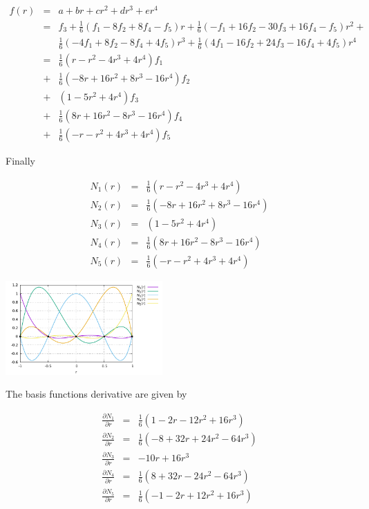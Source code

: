 \begin{eqnarray}
f(r) 
&=& a+br+cr^2+dr^3+er^4 \\
&=& f_3 + 
\frac{1}{6} \left( f_1 -8f_2 +8 f_4 -f_5     \right)  r  +
\frac{1}{6} \left( -f_1 +16f_2 -30f_3    + 16f_4- f_5   \right) r^2 +\\ &&
\frac{1}{6} \left( -4f_1 +8f_2     -8f_4+ 4 f_5   \right) r^3 +
\frac{1}{6} \left( 4f_1 -16f_2 +24f_3 -16f_4+ 4 f_5   \right) r^4 \\
&=& \frac{1}{6} \left(  r- r^2 -4r^3 +4r^4\right) f_1 \\
&+& \frac{1}{6} \left(  -8r+16 r^2 +8r^3 -16 r^4\right) f_2 \\
&+& \left( 1 -5r^2+4r^4  \right) f_3 \\
&+& \frac{1}{6} \left(  8r+16 r^2 -8r^3 -16 r^4\right) f_4 \\
&+& \frac{1}{6} \left(  -r- r^2 +4r^3 +4r^4\right) f_5
\end{eqnarray}

Finally
\begin{mdframed}[backgroundcolor=blue!5]
\begin{eqnarray}
N_1(r)&=& \frac{1}{6} \left(  r- r^2 -4r^3 +4r^4\right) \\
N_2(r)&=& \frac{1}{6} \left(  -8r+16 r^2 +8r^3 -16 r^4\right)  \\
N_3(r)&=& \left( 1 -5r^2+4r^4  \right)  \\
N_4(r)&=& \frac{1}{6} \left(  8r+16 r^2 -8r^3 -16 r^4\right)  \\
N_5(r)&=& \frac{1}{6} \left(  -r- r^2 +4r^3 +4r^4\right) 
\end{eqnarray}
\end{mdframed}


\begin{center}
\includegraphics[width=6cm]{images/basis1D/quartic.pdf}
\end{center}


The basis functions derivative are given by
\begin{mdframed}[backgroundcolor=blue!5]
\begin{eqnarray}
\frac{\partial N_1}{\partial r}&=& \frac{1}{6}(1-2r-12r^2+16r^3)\\
\frac{\partial N_2}{\partial r}&=& \frac{1}{6}(-8+32r+24r^2-64r^3)\\
\frac{\partial N_3}{\partial r}&=& -10r+16r^3\\
\frac{\partial N_4}{\partial r}&=& \frac{1}{6} (8+32r-24r^2-64r^3)\\
\frac{\partial N_5}{\partial r}&=& \frac{1}{6} (-1-2r+12r^2+16r^3) 
\end{eqnarray}
\end{mdframed}


